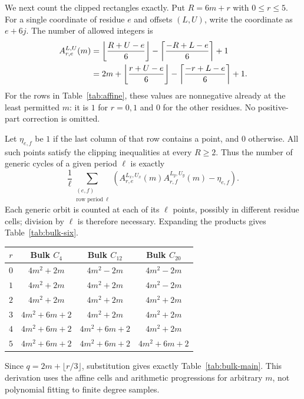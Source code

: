 We next count the clipped rectangles exactly. Put $R=6m+r$ with
$0\le r\le5$. For a single coordinate of residue $e$ and offsets
$(L,U)$, write the coordinate as $e+6j$. The number of allowed
integers is
\begin{align}
 A_{r,e}^{L,U}(m)
 &=\left\lfloor\frac{R+U-e}{6}\right\rfloor
   -\left\lceil\frac{-R+L-e}{6}\right\rceil+1 \notag\\
 &=2m+\left\lfloor\frac{r+U-e}{6}\right\rfloor
   -\left\lceil\frac{-r+L-e}{6}\right\rceil+1.
 \label{eq:ap-count}
\end{align}
For the rows in Table~\ref{tab:affine}, these values are nonnegative
already at the least permitted $m$: it is $1$ for $r=0,1$ and $0$
for the other residues. No positive-part correction is omitted.

Let $\eta_{e,f}$ be $1$ if the last column of that row contains a
point, and $0$ otherwise. All such points satisfy the clipping
inequalities at every $R\ge2$. Thus the number of generic cycles
of a given period $\ell$ is exactly
\begin{equation}\label{eq:bulk-sum}
 \frac1\ell
 \sum_{\substack{(e,f)\\\text{row period }\,\ell}}
 \left(A_{r,e}^{L_x,U_x}(m)A_{r,f}^{L_y,U_y}(m)-\eta_{e,f}\right).
\end{equation}
Each generic orbit is counted at each of its $\ell$ points,
possibly in different residue cells; division by $\ell$ is therefore
necessary. Expanding the products gives Table~\ref{tab:bulk-six}.

\begin{center}
\begin{minipage}{\linewidth}
\centering
\begin{tabular}{cccc}
\toprule
$r$ & Bulk $C_4$ & Bulk $C_{12}$ & Bulk $C_{20}$\\
\midrule
$0$ & $4m^2+2m$ & $4m^2-2m$ & $4m^2-2m$\\
$1$ & $4m^2+2m$ & $4m^2+2m$ & $4m^2-2m$\\
$2$ & $4m^2+2m$ & $4m^2+2m$ & $4m^2+2m$\\
$3$ & $4m^2+6m+2$ & $4m^2+2m$ & $4m^2+2m$\\
$4$ & $4m^2+6m+2$ & $4m^2+6m+2$ & $4m^2+2m$\\
$5$ & $4m^2+6m+2$ & $4m^2+6m+2$ & $4m^2+6m+2$\\
\bottomrule
\end{tabular}
\label{tab:bulk-six}
\end{minipage}
\end{center}

Since $q=2m+\lfloor r/3\rfloor$, substitution gives exactly
Table~\ref{tab:bulk-main}. This derivation uses the affine cells and
arithmetic progressions for arbitrary $m$, not polynomial fitting
to finite degree samples.
